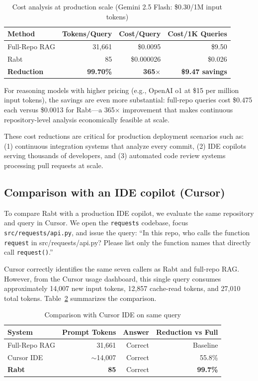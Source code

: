 \documentclass[11pt]{article}
\begin{document}
\begin{table}[t]
\centering
\caption{Cost analysis at production scale (Gemini 2.5 Flash: \$0.30/1M input tokens)}
\label{tab:cost-analysis}
\begin{tabular}{@{}lrrr@{}}
\toprule
\textbf{Method} & \textbf{Tokens/Query} & \textbf{Cost/Query} & \textbf{Cost/1K Queries} \\
\midrule
Full-Repo RAG & 31,661 & \$0.0095 & \$9.50 \\
Rabt & 85 & \$0.000026 & \$0.026 \\
\midrule
\textbf{Reduction} & \textbf{99.70\%} & \textbf{365$\times$} & \textbf{\$9.47 savings} \\
\bottomrule
\end{tabular}
\end{table}

For reasoning models with higher pricing (e.g., OpenAI o1 at \$15 per million input tokens), the savings are even more substantial:
full-repo queries cost \$0.475 each versus \$0.0013 for Rabt---a 365$\times$ improvement that makes continuous repository-level analysis economically feasible at scale.

These cost reductions are critical for production deployment scenarios such as:
(1) continuous integration systems that analyze every commit,
(2) IDE copilots serving thousands of developers, and
(3) automated code review systems processing pull requests at scale.




\subsection{Comparison with an IDE copilot (Cursor)}

To compare Rabt with a production IDE copilot, we evaluate the same repository and query in Cursor.
We open the \texttt{requests} codebase, focus \texttt{src/requests/api.py}, and issue the query:
``In this repo, who calls the function \texttt{request} in src/requests/api.py? Please list only the function names that directly call \texttt{request()}.''

Cursor correctly identifies the same seven callers as Rabt and full-repo RAG.
However, from the Cursor usage dashboard, this single query consumes approximately 14,007 new input tokens, 12,857 cache-read tokens, and 27,010 total tokens.
Table~\ref{tab:cursor-comparison} summarizes the comparison.

\begin{table}[t]
\centering
\caption{Comparison with Cursor IDE on same query}
\label{tab:cursor-comparison}
\begin{tabular}{@{}lrrr@{}}
\toprule
\textbf{System} & \textbf{Prompt Tokens} & \textbf{Answer} & \textbf{Reduction vs Full} \\
\midrule
Full-Repo RAG & 31,661 & Correct & Baseline \\
Cursor IDE & $\sim$14,007 & Correct & 55.8\% \\
\textbf{Rabt} & \textbf{85} & Correct & \textbf{99.7\%} \\
\bottomrule
\end{tabular}
\end{table}
\end{document}

